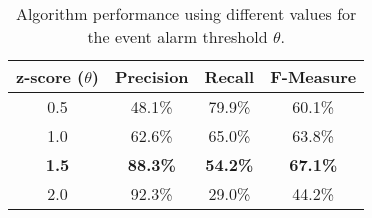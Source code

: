 \begin{table}
\centering
\begin{tabular}{cccc}
\toprule
{z-score ($\theta$)} & {Precision} & {Recall} & {F-Measure} \\ 
\midrule
{0.5}    & {48.1\%}     & {79.9\%}  & {60.1\%}  \\ 
{1.0}    & {62.6\%}     & {65.0\%}  & {63.8\%}  \\ 
{\bf 1.5}    & {\bf 88.3\%}     & {\bf 54.2\%}  & {\bf 67.1\%}  \\
{2.0}    & {92.3\%}     & {29.0\%}  & {44.2\%}  \\ 
\bottomrule
\end{tabular}
\caption{Algorithm performance using different values for the event alarm threshold $\theta$. }
\label{table:zscore}
\end{table}
